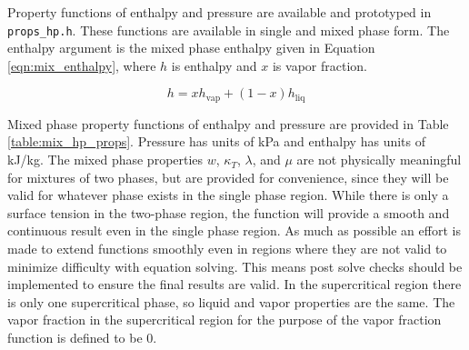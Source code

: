 \documentclass[oneside]{book}
\begin{document}
Property functions of enthalpy and pressure are available and prototyped in \texttt{props\_hp.h}.  These functions are available in single and mixed phase form.  The enthalpy argument is the mixed phase enthalpy given in Equation \ref{eqn:mix_enthalpy}, where $h$ is enthalpy and $x$ is vapor fraction. 

\begin{equation}\label{eqn:mix_enthalpy}
	h = x h_{\text{vap}} + (1 - x) h_{\text{liq}}
\end{equation}

Mixed phase property functions of enthalpy and pressure are provided in Table \ref{table:mix_hp_props}. Pressure has units of kPa and enthalpy has units of kJ/kg.  The mixed phase properties $w$, $\kappa_T$, $\lambda$, and $\mu$ are not physically meaningful for mixtures of two phases, but are provided for convenience, since they will be valid for whatever phase exists in the single phase region.  While there is only a surface tension in the two-phase region, the function will provide a smooth and continuous result even in the single phase region. As much as possible an effort is made to extend functions smoothly even in regions where they are not valid to minimize difficulty with equation solving.  This means post solve checks should be implemented to ensure the final results are valid.  In the supercritical region there is only one supercritical phase, so liquid and vapor properties are the same.  The vapor fraction in the supercritical region for the purpose of the vapor fraction function is defined to be 0.
\end{document}
